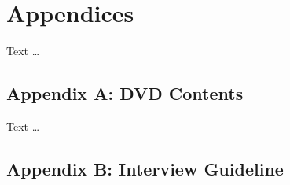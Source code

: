 \chapter*{Appendices}

Text \dots

{}
\section*{Appendix A: DVD Contents}\label{appendix:dvd_contents}

Text \dots

{}
\section*{Appendix B: Interview Guideline}\label{appendix:interview_guideline}


